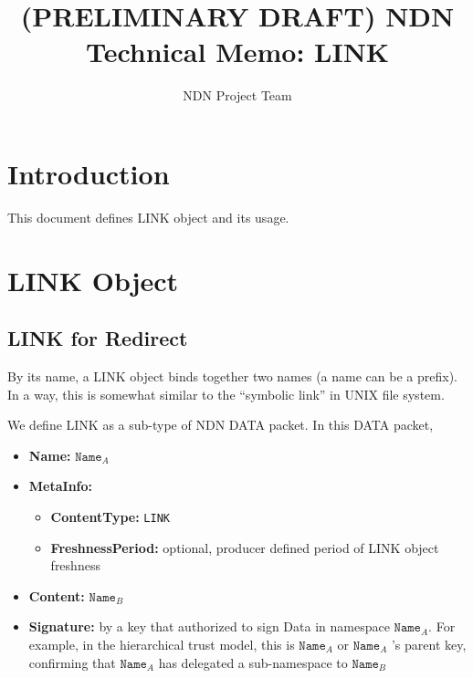 \documentclass[10pt]{article}
\title{(PRELIMINARY DRAFT) NDN Technical Memo: LINK}
\author{NDN Project Team}
\date{}
\begin{document}
\maketitle



\section{Introduction}

This document defines LINK object and its usage.

\section{LINK Object}

\subsection{LINK for Redirect}

By its name, a LINK object binds together two names (a name can be a prefix).
In a way, this is somewhat similar to the ``symbolic link'' in UNIX file system.

We define LINK as a sub-type of NDN DATA packet. In this DATA packet,

\begin{itemize}
\item \textbf{Name:} $\mathtt{Name}_A$
\item \textbf{MetaInfo:}
  \begin{itemize}
  \item \textbf{ContentType:} \verb|LINK|
  \item \textbf{FreshnessPeriod:} optional, producer defined period of LINK object freshness
  \end{itemize}
\item \textbf{Content:} $\mathtt{Name}_B$
\item \textbf{Signature:} by a key that authorized to sign Data in namespace $\mathtt{Name}_A$.
  For example, in the hierarchical trust model, this is $\mathtt{Name}_A$ or $\mathtt{Name}_A$ 's parent key, confirming that $\mathtt{Name}_A$ has delegated a sub-namespace to $\mathtt{Name}_B$
\end{itemize}
\end{document}
